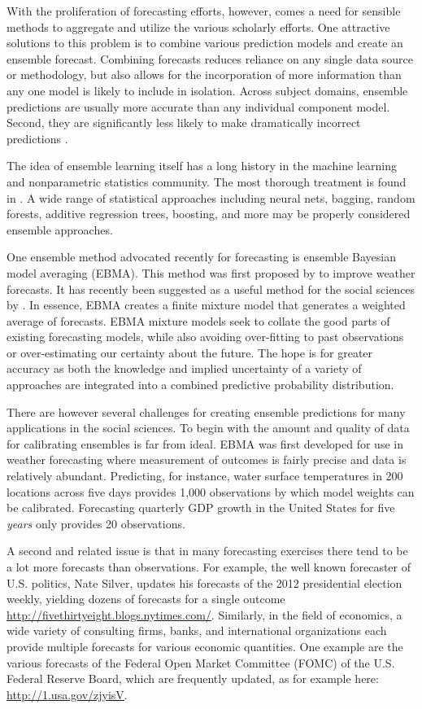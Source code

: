 \documentclass[12pt,fullpage,endnotes]{article}
\begin{document}
With the proliferation of forecasting efforts, however, comes a need
for sensible methods to aggregate and utilize the various scholarly
efforts.  One attractive solutions to this problem is to combine
various prediction models and create an ensemble forecast.  Combining
forecasts reduces reliance on any single data source or methodology,
but also allows for the incorporation of more information than any one
model is likely to include in isolation.  Across subject domains,
ensemble predictions are usually more accurate than any individual
component model. Second, they are significantly less likely to make
dramatically incorrect predictions \citep{Bates:1969,Armstrong:2001,Raftery:2005}.

The idea of ensemble learning itself has a long history in the machine
learning and nonparametric statistics community. The most thorough
treatment is found in \citet{Hastie:2009}. A wide range of statistical
approaches including neural nets, bagging, random forests, additive
regression trees, boosting, and more may be properly considered
ensemble approaches.  

One ensemble method advocated recently for forecasting is ensemble
Bayesian model averaging (EBMA). This method was first proposed by
\citet{Raftery:2005} to improve weather forecasts. It has recently been suggested as a useful method for the
social sciences by \citet{mhw:2012}. In essence, EBMA creates a
finite mixture model that generates a weighted average of
forecasts.  EBMA mixture models seek to collate the good parts of
existing forecasting models, while also avoiding over-fitting to past
observations or over-estimating our certainty about the future.  The
hope is for greater accuracy as both the knowledge and implied
uncertainty of a variety of approaches are integrated into a combined
predictive probability distribution.

There are however several challenges for creating ensemble
predictions for many applications in the social sciences.  To begin with the
amount and quality of data for calibrating ensembles is far from
ideal.  EBMA was first developed for use in weather forecasting where
measurement of outcomes is fairly precise and data is relatively
abundant.  Predicting, for instance, water surface temperatures in 200
locations across five days provides 1,000 observations by which model
weights can be calibrated.  Forecasting quarterly GDP
growth in the United States for five \textit{years} only provides 20 observations.

A second and related issue is that in many forecasting exercises there tend to be a lot more
forecasts than observations.  For example, the well known forecaster of U.S. politics, Nate Silver,
updates his forecasts of the 2012 presidential election weekly, yielding dozens of forecasts
for a single outcome \url{http://fivethirtyeight.blogs.nytimes.com/}.  Similarly, in the field of economics, a wide variety of consulting firms, banks, and international organizations each provide multiple
forecasts for various economic quantities. One example are the various forecasts of the Federal Open Market Committee (FOMC) of the U.S. Federal Reserve Board, which are frequently updated, as for example here: \url{http://1.usa.gov/zjyisV}.
\end{document}
